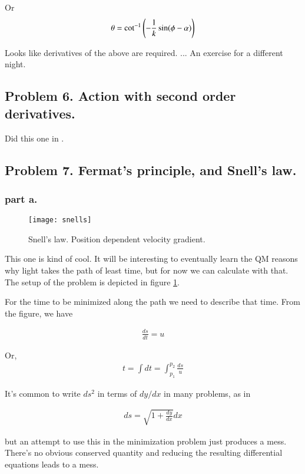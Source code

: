 Or
\begin{align*}
\theta = \cot^{-1}\left(-\frac{1}{k} \sin(\phi - \alpha)\right)
\end{align*}

Looks like derivatives of the above are required. ... An exercise for a different night.

\subsection{Problem 6.  Action with second order derivatives. }

Did this one in .

\subsection{Problem 7.  Fermat's principle, and Snell's law. }

\subsubsection{part a. }

\begin{figure}[htp]
\centering
\texttt{[image: snells]}
\caption{Snell's law.  Position dependent velocity gradient.}\label{fig:snells}
\end{figure}

This one is kind of cool.  It will be interesting to eventually learn the QM reasons why light takes the path of least time, but for now we can calculate with that.  The setup of the problem is depicted in figure \ref{fig:snells}.

For the time to be minimized along the path we need to describe that time.  From the figure, we have

\begin{align*}
\frac{ds}{dt} = u
\end{align*}

Or, 
\begin{align*}
t = \int dt = \int_{p_1}^{p_2} \frac{ds}{u}
\end{align*}

It's common to write $ds^2$ in terms of $dy/dx$ in many problems, as in 

\begin{align*}
ds = \sqrt{1 + \frac{dy}{dx}} dx
\end{align*}

but an attempt to use this in the minimization problem just produces a mess.   There's no obvious conserved quantity and reducing the resulting differential equations
leads to a mess.

